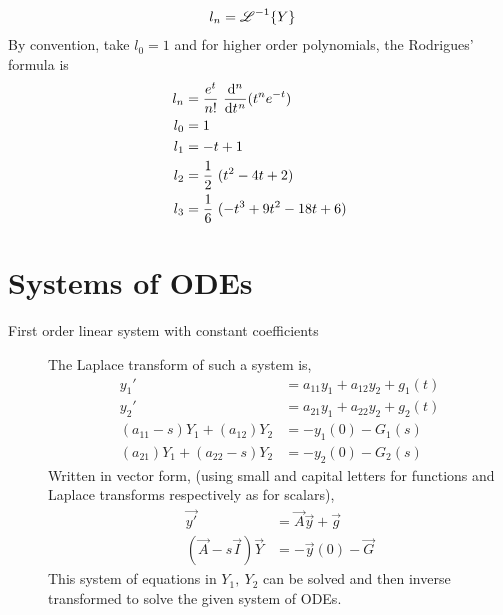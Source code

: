 \begin{description}
\begin{align}
            l_n                               & = \operatorname{\mathscr{L}}^{-1}\{Y\}
        \end{align}
        By convention, take $ l_0 = 1 $ and for higher order polynomials, the Rodrigues'
        formula is
        \begin{align}
            l_n & = \frac{e^t}{n!}\ \difoverride{n} \diff**[n]{t}{(t^n e^{-t})} \\
            l_0 & = 1                                                           \\
            l_1 & = -t + 1                                                      \\
            l_2 & =\frac{1}{2}\ (t^2 - 4t + 2)                                  \\
            l_3 & = \frac{1}{6}\ (-t^3 + 9t^2 - 18t + 6)
        \end{align}
\end{description}

\section{Systems of ODEs}

\begin{description}
    \item[First order linear system with constant coefficients] The Laplace transform of
        such a system is,
        \begin{align}
            y_1'                          & = a_{11}y_1 + a_{12}y_2 + g_1(t) \\
            y_2'                          & = a_{21}y_1 + a_{22}y_2 + g_2(t) \\
            (a_{11} - s)Y_1 + (a_{12})Y_2 & = -y_1(0) - G_1(s)               \\
            (a_{21})Y_1 + (a_{22} - s)Y_2 & = -y_2(0) - G_2(s)
        \end{align}
        Written in vector form, (using small and capital letters for functions and
        Laplace transforms respectively as for scalars),
        \begin{align}
            \vec{y'}                    & = \vec{A}\vec{y} + \vec{g} \\
            (\vec{A} - s\vec{I})\vec{Y} & = -\vec{y}(0) - \vec{G}
        \end{align}
        This system of equations in $ Y_1,\ Y_2$ can be solved and then inverse
        transformed to solve the given system of ODEs.
        
\end{description}